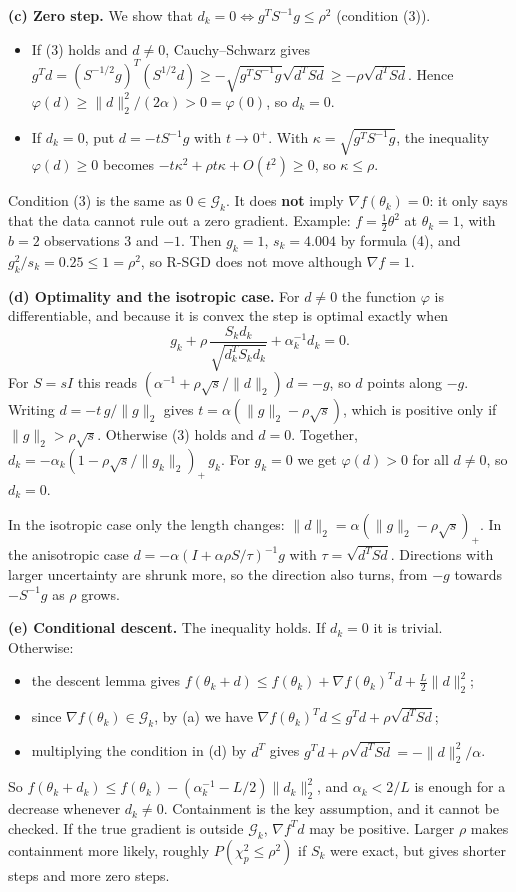 \documentclass[11pt,a4paper]{article}
\newcommand{\G}{\mathcal{G}_k}
\newcommand{\norm}[1]{\lVert #1\rVert_2}
\begin{document}
\textbf{(c) Zero step.} We show that $d_k=0\iff g^TS^{-1}g\le\rho^2$ (condition (3)).
\begin{itemize}
\item If (3) holds and $d\ne0$, Cauchy--Schwarz gives
$g^Td=(S^{-1/2}g)^T(S^{1/2}d)\ge-\sqrt{g^TS^{-1}g}\sqrt{d^TSd}\ge-\rho\sqrt{d^TSd}$. Hence
$\varphi(d)\ge\norm d^2/(2\alpha)>0=\varphi(0)$, so $d_k=0$.
\item If $d_k=0$, put $d=-tS^{-1}g$ with $t\to0^+$. With $\kappa=\sqrt{g^TS^{-1}g}$, the inequality
$\varphi(d)\ge0$ becomes $-t\kappa^2+\rho t\kappa+O(t^2)\ge0$, so $\kappa\le\rho$.
\end{itemize}
Condition (3) is the same as $0\in\G$. It does \textbf{not} imply $\nabla f(\theta_k)=0$: it only says
that the data cannot rule out a zero gradient. Example: $f=\tfrac12\theta^2$ at $\theta_k=1$, with
$b=2$ observations $3$ and $-1$. Then $g_k=1$, $s_k=4.004$ by formula (4), and
$g_k^2/s_k=0.25\le1=\rho^2$, so R-SGD does not move although $\nabla f=1$.

\textbf{(d) Optimality and the isotropic case.} For $d\ne0$ the function $\varphi$ is differentiable,
and because it is convex the step is optimal exactly when
\begin{equation*}
g_k+\rho\,\frac{S_kd_k}{\sqrt{d_k^TS_kd_k}}+\alpha_k^{-1}d_k=0 .
\end{equation*}
For $S=sI$ this reads $(\alpha^{-1}+\rho\sqrt s/\norm d)\,d=-g$, so $d$ points along $-g$. Writing
$d=-t\,g/\norm g$ gives $t=\alpha(\norm g-\rho\sqrt s)$, which is positive only if
$\norm g>\rho\sqrt s$. Otherwise (3) holds and $d=0$. Together,
$d_k=-\alpha_k(1-\rho\sqrt s/\norm{g_k})_+\,g_k$. For $g_k=0$ we get $\varphi(d)>0$ for all $d\ne0$, so
$d_k=0$.

In the isotropic case only the length changes: $\norm{d}=\alpha(\norm g-\rho\sqrt s)_+$. In the
anisotropic case $d=-\alpha(I+\alpha\rho S/\tau)^{-1}g$ with $\tau=\sqrt{d^TSd}$. Directions with
larger uncertainty are shrunk more, so the direction also turns, from $-g$ towards $-S^{-1}g$ as $\rho$
grows.

\textbf{(e) Conditional descent.} The inequality holds. If $d_k=0$ it is trivial. Otherwise:
\begin{itemize}
\item the descent lemma gives $f(\theta_k+d)\le f(\theta_k)+\nabla f(\theta_k)^Td+\tfrac L2\norm d^2$;
\item since $\nabla f(\theta_k)\in\G$, by (a) we have $\nabla f(\theta_k)^Td\le g^Td+\rho\sqrt{d^TSd}$;
\item multiplying the condition in (d) by $d^T$ gives $g^Td+\rho\sqrt{d^TSd}=-\norm d^2/\alpha$.
\end{itemize}
So $f(\theta_k+d_k)\le f(\theta_k)-(\alpha_k^{-1}-L/2)\norm{d_k}^2$, and $\alpha_k<2/L$ is enough for a
decrease whenever $d_k\ne0$. Containment is the key assumption, and it cannot be checked. If the true
gradient is outside $\G$, $\nabla f^Td$ may be positive. Larger $\rho$ makes containment more likely,
roughly $P(\chi^2_p\le\rho^2)$ if $S_k$ were exact, but gives shorter steps and more zero steps.
\end{document}
